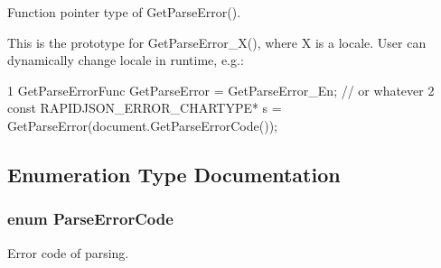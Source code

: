 Function pointer type of Get\+Parse\+Error(). 

This is the prototype for {\ttfamily Get\+Parse\+Error\+\_\+\+X()}, where {\ttfamily X} is a locale. User can dynamically change locale in runtime, e.\+g.\+: 
\begin{DoxyCode}
1 GetParseErrorFunc GetParseError = GetParseError\_En; // or whatever
2 const RAPIDJSON\_ERROR\_CHARTYPE* s = GetParseError(document.GetParseErrorCode());
\end{DoxyCode}
 

\subsection{Enumeration Type Documentation}
\subsubsection[{\texorpdfstring{Parse\+Error\+Code}{ParseErrorCode}}]{\setlength{\rightskip}{0pt plus 5cm}enum {\bf Parse\+Error\+Code}}\hypertarget{group___r_a_p_i_d_j_s_o_n___e_r_r_o_r_s_ga8d4b32dfc45840bca189ade2bbcb6ba7}{}\label{group___r_a_p_i_d_j_s_o_n___e_r_r_o_r_s_ga8d4b32dfc45840bca189ade2bbcb6ba7}


Error code of parsing. 

